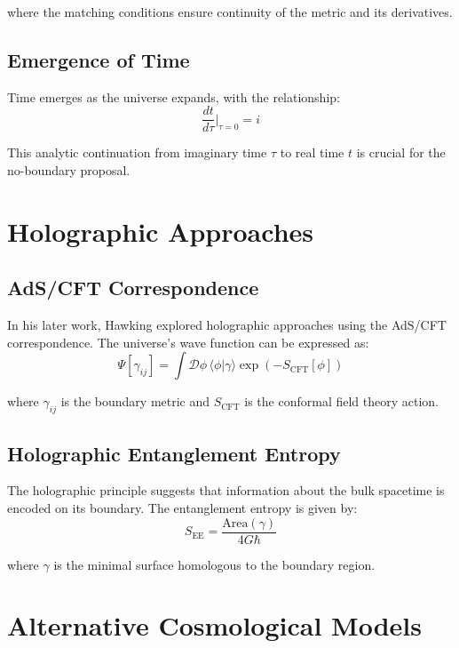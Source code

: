 \documentclass[12pt,a4paper]{article}
\begin{document}
where the matching conditions ensure continuity of the metric and its derivatives.

\subsection{Emergence of Time}

Time emerges as the universe expands, with the relationship:
\begin{equation}
\frac{dt}{d\tau}\bigg|_{\tau=0} = i
\end{equation}

This analytic continuation from imaginary time $\tau$ to real time $t$ is crucial for the no-boundary proposal.

\section{Holographic Approaches}

\subsection{AdS/CFT Correspondence}

In his later work, Hawking explored holographic approaches using the AdS/CFT correspondence. The universe's wave function can be expressed as:
\begin{equation}
\Psi[\gamma_{ij}] = \int \mathcal{D}\phi \, \langle\phi|\gamma\rangle \exp\left(-S_{\text{CFT}}[\phi]\right)
\end{equation}

where $\gamma_{ij}$ is the boundary metric and $S_{\text{CFT}}$ is the conformal field theory action.

\subsection{Holographic Entanglement Entropy}

The holographic principle suggests that information about the bulk spacetime is encoded on its boundary. The entanglement entropy is given by:
\begin{equation}
S_{\text{EE}} = \frac{\text{Area}(\gamma)}{4G\hbar}
\end{equation}

where $\gamma$ is the minimal surface homologous to the boundary region.

\section{Alternative Cosmological Models}
\end{document}
